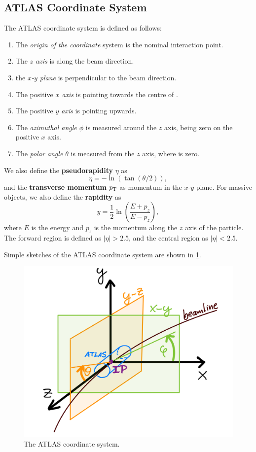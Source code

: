 \subsection{ATLAS Coordinate System}
\label{sec:atlas_coord}
The ATLAS coordinate system is defined as follows:
\begin{enumerate}
    \item The \emph{origin of the coordinate} system is the nominal interaction point.
    \item The \emph{$z$ axis} is along the beam direction.
    \item the \emph{$x$-$y$ plane} is perpendicular to the beam direction.
    \item The positive \emph{$x$ axis} is pointing towards the centre of \LHC.
    \item The positive \emph{$y$ axis} is pointing upwards.
    \item The \emph{azimuthal angle $\phi$} is measured around the $z$ axis, being zero on the positive $x$ axis.
    \item The \emph{polar angle $\theta$} is measured from the $z$ axis, where is zero.
\end{enumerate}
We also define the \textbf{pseudorapidity} $\eta$ as 
\begin{equation}
    \label{eq:pseudorapidity}
    \eta = -\ln(\tan(\theta/2)),
\end{equation}
and the \textbf{transverse momentum} $p_\text{T}$ as momentum in the $x$-$y$ plane.
For massive objects, we also define the \textbf{rapidity} as
\begin{equation}
    \label{eq:rapidity}
    y = \frac{1}{2} \ln\left(\frac{E + p_z}{E - p_z}\right),
\end{equation}
where $E$ is the energy and $p_z$ is the momentum along the $z$ axis of the particle.
The forward region is defined as $|\eta| > 2.5$, and the central region as $|\eta| < 2.5$.

Simple sketches of the ATLAS coordinate system are shown in \cref{fig:atlas_coord}.
\begin{figure}[htb]
    \centering
    \includegraphics[width=0.7\linewidth]{src/img/ATLAS_coords.jpeg}
    \caption{The ATLAS coordinate system.}
    \label{fig:atlas_coord}
\end{figure}


